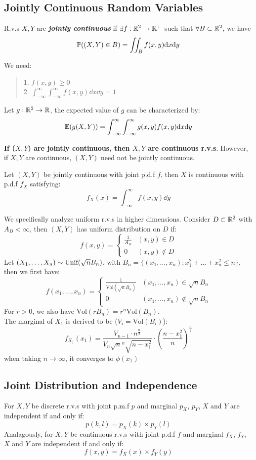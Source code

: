 \subsection{Jointly Continuous Random Variables}
\begin{definition}
    R.v.s $X, Y$ are \textbf{\textit{jointly continuous}} if $\exists f: \mathbb{R}^2 \to \mathbb{R}^+$ such that $\forall B \subset \mathbb{R}^2$, we have
    $$\mathbb{P}((X, Y) \in B) = \iint_B f(x, y) \dd x \dd y$$
\end{definition}
We need:
\begin{quote}
    1. $f(x, y) \ge 0$ \\
    2. $\int_{-\infty}^{\infty}\int_{-\infty}^{\infty} f(x, y) \dd x \dd y = 1$
\end{quote}
\begin{definition}
    Let $g: \mathbb{R}^2 \to \mathbb{R}$, the expected value of $g$ can be characterized by:
    $$\mathbb{E}(g(X, Y)) = \int_{-\infty}^{\infty}\int_{-\infty}^{\infty} g(x, y) f(x, y) \dd x \dd y$$
\end{definition}
\textbf{If ($X, Y$) are jointly continuous, then $X, Y$ are continuous r.v.s}. However, if $X, Y$ are continuous, $(X, Y)$ need not be jointly continuous.
\begin{definition}
    Let $(X, Y)$ be jointly continuous with joint p.d.f $f$, then $X$ is continuous with p.d.f $f_X$ satisfying:
    $$f_X(x) = \int_{-\infty}^{\infty} f(x, y) \dd y$$
\end{definition}
We specifically analyze uniform r.v.s in higher dimensions. Consider $D \subset \mathbb{R}^2$ with $A_D < \infty$, then $(X, Y)$ has uniform distribution on $D$ if:
$$f(x, y) = \begin{cases}
    \frac{1}{A_D} & (x, y) \in D \\
    0 & (x, y) \notin D
\end{cases}$$
Let $(X_1, \dots, X_n) \sim \text{Unif}(\sqrt{n}B_n)$, with $B_n = \{(x_1, \dots, x_n): x_1^2 + \dots + x_n^2 \le n\}$, then we first have:
$$f(x_1, \dots, x_n) = \begin{cases}
    \frac{1}{\text{Vol}(\sqrt{n}B_n)} & (x_1, \dots, x_n) \in \sqrt{n}B_n \\
    0 & (x_1, \dots, x_n) \notin \sqrt{n}B_n
\end{cases}$$
For $r > 0$, we also have $\text{Vol}(rB_n) = r^n\text{Vol}(B_n)$. \\
The marginal of $X_1$ is derived to be ($V_i = \text{Vol}(B_i)$):
$$f_{X_1}(x_1) = \frac{V_{n-1} \cdot n^{\frac{n}{2}}}{V_n \sqrt{n}^n \sqrt{n - x_1^2}} \cdot (\frac{n - x_1^2}{n})^{\frac{n}{2}}$$
when taking $n \to \infty$, it converges to $\phi(x_1)$

\subsection{Joint Distribution and Independence}
For $X, Y$ be discrete r.v.s with joint p.m.f $p$ and marginal $p_X$, $p_Y$, $X$ and $Y$ are independent if and only if:
$$p(k, l) = p_X(k) \times p_Y(l)$$
Analagously, for $X, Y$ be continuous r.v.s with joint p.d.f $f$ and marginal $f_X$, $f_Y$, $X$ and $Y$ are independent if and only if:
$$f(x, y) = f_X(x) \times f_Y(y)$$

\newpage